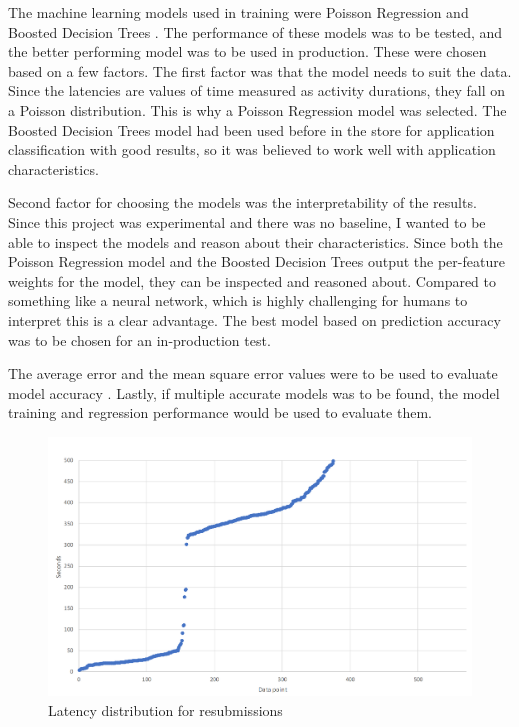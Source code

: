 The machine learning models used in training were Poisson Regression \cite{azurepoisson} and Boosted Decision Trees \cite{azurebdt}.
The performance of these models was to be tested, and the better performing model was to be used in production.
These were chosen based on a few factors.
The first factor was that the model needs to suit the data.
Since the latencies are values of time measured as activity durations, they fall on a Poisson distribution. 
This is why a Poisson Regression model was selected.
The Boosted Decision Trees model had been used before in the store for application classification with good results, so it was believed to work well with application characteristics.

Second factor for choosing the models was the interpretability of the results.
Since this project was experimental and there was no baseline, I wanted to be able to inspect the models and reason about their characteristics.
Since both the Poisson Regression model and the Boosted Decision Trees output the per-feature weights for the model, they can be inspected and reasoned about.
Compared to something like a neural network, which is highly challenging for humans to interpret  this is a clear advantage.
The best model based on prediction accuracy was to be chosen for an in-production test.

The average error and the mean square error values were to be used to evaluate model accuracy .
Lastly, if multiple accurate models was to be found, the model training and regression performance would be used to evaluate them.

\begin{figure}[htb]
    \centering \includegraphics[width=0.6\linewidth]{gfx/resubmissions.png}
    \caption{Latency distribution for resubmissions }
    \label{fig:resubmissions}
\end{figure}

